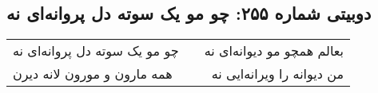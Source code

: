 \begin{center}
\section*{دوبیتی شماره ۲۵۵: چو مو یک سوته دل پروانه‌ای نه}
\label{sec:255}
\begin{longtable}{l p{0.5cm} r}
چو مو یک سوته دل پروانه‌ای نه
&&
بعالم همچو مو دیوانه‌ای نه
\\
همه مارون و مورون لانه دیرن
&&
من دیوانه را ویرانه‌ایی نه
\\
\end{longtable}
\end{center}
